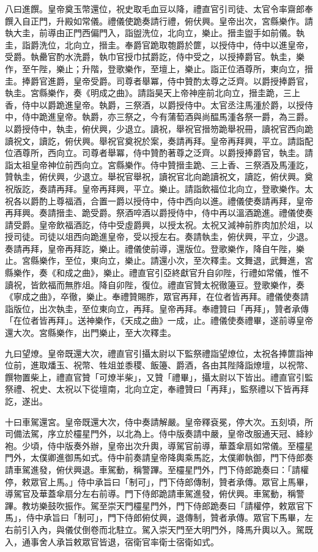 \begin{pinyinscope}
 八曰進饌。皇帝奠玉幣還位，祝史取毛血豆以降，禮直官引司徒、太官令率齋郎奉饌入自正門，升殿如常儀。禮儀使跪奏請行禮，俯伏興。皇帝出次，宮縣樂作。請執大圭，前導由正門西偏門入，詣盥洗位，北向立，樂止。搢圭盥手如前儀。執圭，詣爵洗位，北向立，搢圭。奉爵官跪取匏爵於篚，以授侍中，侍中以進皇帝，受爵。執罍官酌水洗爵，執巾官授巾拭爵訖，侍中受之，以授捧爵官。執圭，樂作，至午陛，樂止；升階，登歌樂作，至壇上，樂止。詣正位酒尊所，東向立，搢圭。捧爵官進爵，皇帝受爵。司尊者舉冪，侍中贊酌太尊之泛齊。以爵授捧爵官，執圭。宮縣樂作，奏《明成之曲》。請詣昊天上帝神座前北向立，搢圭跪，三上香，侍中以爵跪進皇帝。執爵，三祭酒，以爵授侍中。太官丞注馬湩於爵，以授侍中，侍中跪進皇帝。執爵，亦三祭之，今有蒲萄酒與尚醖馬湩各祭一爵，為三爵。以爵授侍中，執圭，俯伏興，少退立。讀祝，舉祝官搢笏跪舉祝冊，讀祝官西向跪讀祝文，讀訖，俯伏興。舉祝官奠祝於案，奏請再拜。皇帝再拜興，平立。請詣配位酒尊所，西向立。司尊者舉冪，侍中贊酌著尊之泛齊。以爵授捧爵官，執圭。請詣太祖皇帝神位前西向立。宮縣樂作。侍中贊搢圭跪、三上香、三祭酒及馬湩訖，贊執圭，俯伏興，少退立。舉祝官舉祝，讀祝官北向跪讀祝文，讀訖，俯伏興。奠祝版訖，奏請再拜。皇帝再拜興，平立。樂止。請詣飲福位北向立，登歌樂作。太祝各以爵酌上尊福酒，合置一爵以授侍中，侍中西向以進。禮儀使奏請再拜，皇帝再拜興。奏請搢圭、跪受爵。祭酒啐酒以爵授侍中，侍中再以溫酒跪進。禮儀使奏請受爵。皇帝飲福酒訖，侍中受虛爵興，以授太祝。太祝又減神前胙肉加於俎，以授司徒。司徒以俎西向跪進皇帝，受以授左右。奏請執圭，俯伏興，平立，少退。奏請再拜，皇帝再拜訖，樂止。禮儀使前導，還版位。登歌樂作，降自午陛，樂止。宮縣樂作，至位，東向立，樂止。請還小次，至次釋圭。文舞退，武舞進，宮縣樂作，奏《和成之曲》，樂止。禮直官引亞終獻官升自卯陛，行禮如常儀，惟不讀祝，皆飲福而無胙俎。降自卯陛，復位。禮直官贊太祝徹籩豆。登歌樂作，奏《寧成之曲》，卒徹，樂止。奉禮贊賜胙，眾官再拜，在位者皆再拜。禮儀使奏請詣版位，出次執圭，至位東向立，再拜。皇帝再拜。奉禮贊曰「再拜」，贊者承傳「在位者皆再拜」。送神樂作，《天成之曲》一成，止。禮儀使奏禮畢，遂前導皇帝還大次。宮縣樂作，出門樂止，至大次釋圭。



 九曰望燎。皇帝既還大次，禮直官引攝太尉以下監祭禮詣望燎位，太祝各捧篚詣神位前，進取燔玉、祝幣、牲俎並黍稷、飯籩、爵酒，各由其陛降詣燎壇，以祝幣、饌物置柴上，禮直官贊「可燎半柴」，又贊「禮畢」，攝太尉以下皆出。禮直官引監祭禮、祝史、太祝以下從壇南，北向立定，奉禮贊曰「再拜」，監祭禮以下皆再拜訖，遂出。



 十曰車駕還宮。皇帝既還大次，侍中奏請解嚴。皇帝釋袞冕，停大次。五刻頃，所司備法駕，序立於欞星門外，以北為上。侍中版奏請中嚴，皇帝改服通天冠、絳紗袍。少頃，侍中版奏外辦，皇帝出次升輿，導駕官前導，華蓋傘扇如常儀。至欞星門外，太僕卿進御馬如式。侍中前奏請皇帝降輿乘馬訖，太僕卿執御，門下侍郎奏請車駕進發，俯伏興退。車駕動，稱警蹕。至欞星門外，門下侍郎跪奏曰：「請權停，敕眾官上馬。」侍中承旨曰「制可」，門下侍郎傳制，贊者承傳。眾官上馬畢，導駕官及華蓋傘扇分左右前導。門下侍郎跪請車駕進發，俯伏興。車駕動，稱警蹕。教坊樂鼓吹振作。駕至崇天門欞星門外，門下侍郎跪奏曰「請權停，敕眾官下馬」，侍中承旨曰「制可」，門下侍郎俯仗興，退傳制，贊者承傳。眾官下馬畢，左右前引入內，與儀仗倒卷而北駐立。駕入崇天門至大明門外，降馬升輿以入。駕既入，通事舍人承旨敕眾官皆退，宿衛官率衛士宿衛如式。




\end{pinyinscope}
